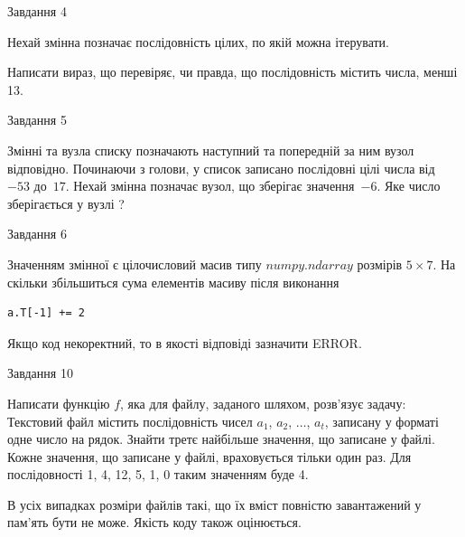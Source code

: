 \documentclass[12pt, ukrainian]{article}
\begin{document}
{               
{\begin{center}Завдання {4}\end{center}}
\vspace{-6mm}
Нехай змінна  позначає послідовність цілих, по якій можна ітерувати.

Написати вираз, що перевіряє, чи правда, що послідовність  містить числа, менші 13.\par

\vspace{10mm}
               
{\begin{center}Завдання {5}\end{center}}
\vspace{-6mm}
Змінні  та  вузла списку позначають наступний та попередній за ним вузол відповідно. Починаючи з голови, у список записано послідовні цілі числа від~$-53$ до~$17$. Нехай змінна  позначає вузол, що зберігає значення~$-6$.
Яке число зберігається у вузлі  ?\par

               
{\begin{center}Завдання {6}\end{center}}
\vspace{-6mm}
Значенням змінної  є цілочисловий масив типу $numpy.ndarray$ розмірів $5{\times}7$. На скільки збільшиться сума елементів масиву  після виконання
\begin{verbatim}
a.T[-1] += 2
\end{verbatim}


Якщо код некоректний, то в якості відповіді зазначити ERROR.\par

               
{\begin{center}Завдання {10}\end{center}}
\vspace{-6mm}

Написати функцію $f$, яка для файлу, заданого шляхом, розв’язує задачу:\\ Текстовий файл містить послідовність чисел $a_1$, $a_2$, $\ldots$, $a_t$, записану у форматі одне число на рядок. Знайти третє найбільше значення, що записане у файлі. Кожне значення, що записане у файлі, враховується тільки один раз. Для послідовності 1, 4, 12, 5, 1, 0 таким значенням буде 4.

В усіх випадках розміри файлів такі, що їх вміст повністю завантажений у пам'ять бути не може. Якість коду також оцінюється.



}
\end{document}
